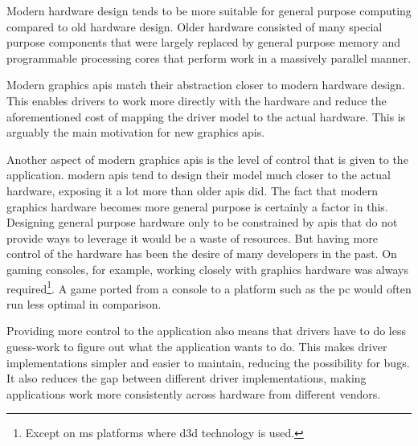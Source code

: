     Modern hardware design tends to be more suitable for general purpose computing compared to old hardware design.
    Older hardware consisted of many special purpose components that were largely replaced by general purpose memory and programmable processing cores that perform work in a massively parallel manner.


    Modern graphics \glspl{api} match their abstraction closer to modern hardware design.
    This enables drivers to work more directly with the hardware and reduce the aforementioned cost of mapping the driver model to the actual hardware.
    This is arguably the main motivation for new graphics \glspl{api}.

    Another aspect of modern graphics \glspl{api} is the level of control that is given to the application.
    modern \glspl{api} tend to design their model much closer to the actual hardware, exposing it a lot more than older \glspl{api} did.
    The fact that modern graphics hardware becomes more general purpose is certainly a factor in this.
    Designing general purpose hardware only to be constrained by \glspl{api} that do not provide ways to leverage it would be a waste of resources.
    But having more control of the hardware has been the desire of many developers in the past.
    On gaming consoles, for example, working closely with graphics hardware was always required\footnote{Except on \gls{ms} platforms where \gls{d3d} technology is used.}.
    A game ported from a console to a platform such as the \gls{pc} would often run less optimal in comparison.

    Providing more control to the application also means that drivers have to do less guess-work to figure out what the application wants to do.
    This makes driver implementations simpler and easier to maintain, reducing the possibility for \glspl{bug}.
    It also reduces the gap between different driver implementations, making applications work more consistently across hardware from different vendors.


